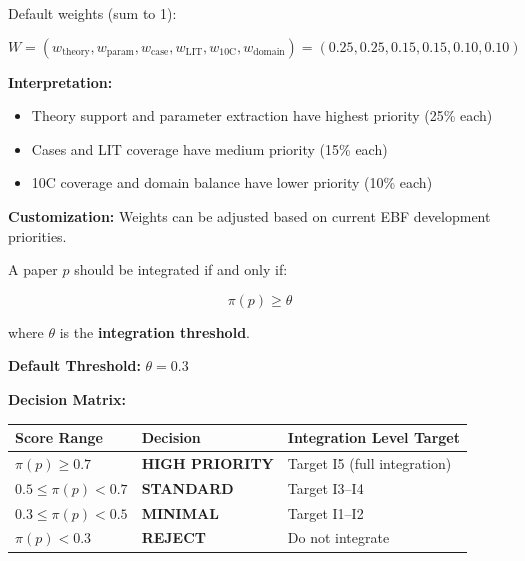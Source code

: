 \begin{tcolorbox}[colback=blue!5!white, colframe=blue!75!black,
    title=\textbf{Definition 8: Weight Vector $W = (w_1, \ldots, w_6)$ (Priorities)}]

Default weights (sum to 1):

\begin{equation}
W = (w_{\text{theory}}, w_{\text{param}}, w_{\text{case}}, w_{\text{LIT}}, w_{\text{10C}}, w_{\text{domain}}) = (0.25, 0.25, 0.15, 0.15, 0.10, 0.10)
\end{equation}

\textbf{Interpretation:}
\begin{itemize}[nosep]
    \item Theory support and parameter extraction have highest priority (25\% each)
    \item Cases and LIT coverage have medium priority (15\% each)
    \item 10C coverage and domain balance have lower priority (10\% each)
\end{itemize}

\textbf{Customization:} Weights can be adjusted based on current EBF development priorities.

\end{tcolorbox}

\begin{tcolorbox}[colback=green!5!white, colframe=green!75!black,
    title=\textbf{Axiom MECE-4: Integration Decision Rule}]

A paper $p$ should be integrated if and only if:

\begin{equation}
\pi(p) \geq \theta
\end{equation}

where $\theta$ is the \textbf{integration threshold}.

\textbf{Default Threshold:} $\theta = 0.3$

\textbf{Decision Matrix:}

\begin{tabular}{@{}lll@{}}
\toprule
\textbf{Score Range} & \textbf{Decision} & \textbf{Integration Level Target} \\
\midrule
$\pi(p) \geq 0.7$ & \textbf{HIGH PRIORITY} & Target I5 (full integration) \\
$0.5 \leq \pi(p) < 0.7$ & \textbf{STANDARD} & Target I3--I4 \\
$0.3 \leq \pi(p) < 0.5$ & \textbf{MINIMAL} & Target I1--I2 \\
$\pi(p) < 0.3$ & \textbf{REJECT} & Do not integrate \\
\bottomrule
\end{tabular}

\end{tcolorbox}

